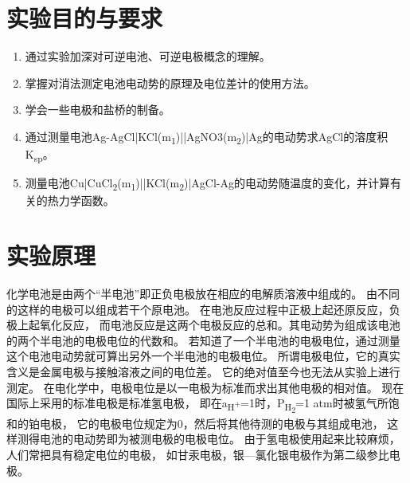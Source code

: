 \documentclass[11pt]{report}
\begin{document}
\chapter{实验目的与要求}
\label{sec:org9387770}
\begin{enumerate}
\item 通过实验加深对可逆电池、可逆电极概念的理解。
\item 掌握对消法测定电池电动势的原理及电位差计的使用方法。
\item 学会一些电极和盐桥的制备。
\item 通过测量电池Ag-AgCl|KCl(m\textsubscript{1})||AgNO3(m\textsubscript{2})|Ag的电动势求AgCl的溶度积K\textsubscript{sp}。
\item 测量电池Cu|CuCl\textsubscript{2}(m\textsubscript{1})||KCl(m\textsubscript{2})|AgCl-Ag的电动势随温度的变化，并计算有关的热力学函数。
\end{enumerate}
\chapter{实验原理}
\label{sec:org490d568}
化学电池是由两个“半电池”即正负电极放在相应的电解质溶液中组成的。
由不同的这样的电极可以组成若干个原电池。
在电池反应过程中正极上起还原反应，负极上起氧化反应，
而电池反应是这两个电极反应的总和。其电动势为组成该电池的两个半电池的电极电位的代数和。
若知道了一个半电池的电极电位，通过测量这个电池电动势就可算出另外一个半电池的电极电位。
所谓电极电位，它的真实含义是金属电极与接触溶液之间的电位差。
它的绝对值至今也无法从实验上进行测定。
在电化学中，电极电位是以一电极为标准而求出其他电极的相对值。
现在国际上采用的标准电极是标准氢电极，
即在a\textsubscript{H\textsuperscript{+}}=1时，P\textsubscript{H\textsubscript{2}}=1 atm时被氢气所饱和的铂电极，
它的电极电位规定为0，然后将其他待测的电极与其组成电池，
这样测得电池的电动势即为被测电极的电极电位。
由于氢电极使用起来比较麻烦，人们常把具有稳定电位的电极，
如甘汞电极，银—氯化银电极作为第二级参比电极。
\end{document}
